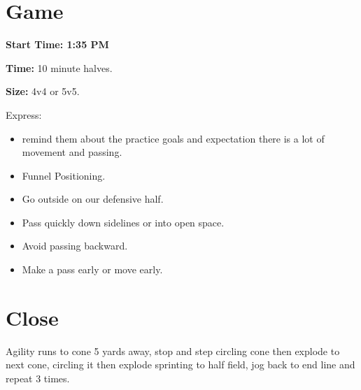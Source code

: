 \documentclass[10pt,letterpaper]{article}
\newenvironment{oddBlock}[1]{%
    \tcolorbox[beamer,%
    noparskip,breakable,
    colback=LightBlue,colframe=DarkBlue,%
    colbacklower=DarkBlue!75!LightBlue,%
    title=#1]}%
    {\endtcolorbox}
\begin{document}
\section{Game}

\textbf{Start Time: 1:35 PM}

\begin{oddBlock}{Small Sided}
    \textbf{Time:} 10 minute halves.

    \textbf{Size:} 4v4 or 5v5.

    Express:
    \begin{itemize}
        \setlength{\itemsep}{0pt}
        \setlength{\parskip}{0pt}
        \setlength{\parsep}{0pt}
        \item  remind them about the practice goals and expectation there is a lot of movement and passing.
        \item Funnel Positioning.
        \item Go outside on our defensive half.
        \item Pass quickly down sidelines or into open space.
        \item Avoid passing backward.
        \item Make a pass early or move early.
    \end{itemize}

\end{oddBlock}

\section{Close}
\begin{oddBlock}{Sprints (5 min)}
    Agility runs to cone 5 yards away, stop and step circling cone then explode to next cone, circling it then explode sprinting to half field, jog back to end line and repeat 3 times.
\end{oddBlock}
\end{document}
